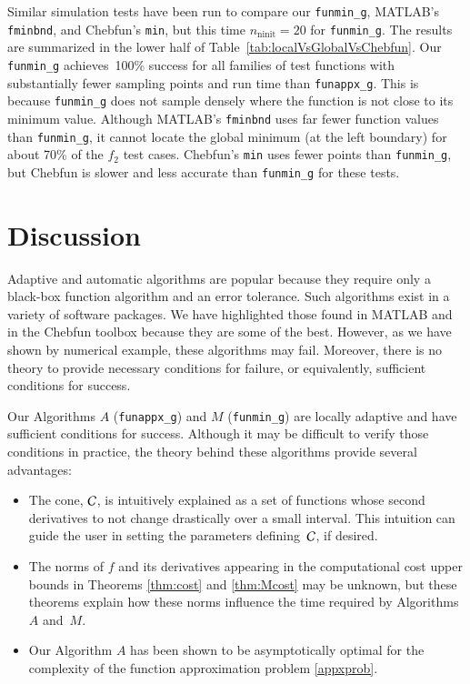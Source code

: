 \documentclass[review]{elsarticle}
\theoremstyle{definition}
\DeclareMathOperator{\ninit}{ninit}
\newcommand{\funappxg}{\texttt{funappx\_g}\xspace}
\newcommand{\funming}{\texttt{funmin\_g}\xspace}
\newcommand{\fminbnd}{\texttt{fminbnd}\xspace}
\begin{document}
Similar simulation tests have been run to compare our \funming, MATLAB's \fminbnd, and
Chebfun's \texttt{min}, but this time $n_{\ninit} = 20$ for \funming. The results are
summarized in the lower half of
Table~\ref{tab:localVsGlobalVsChebfun}. Our \funming{} achieves~100\%
success for all families of test functions with substantially fewer sampling
points and run time than \funappxg. This is because \funming does not 
sample densely where the function is not close to its minimum value. Although MATLAB's
\fminbnd uses far fewer function values than \funming, it cannot locate the
global minimum (at the left boundary) for about 70\% of the $f_2$ test cases.
Chebfun's {\tt min} uses fewer points than \funming, but Chebfun is slower and
less accurate than \funming for these tests.






\section{Discussion}

Adaptive and automatic algorithms are popular because they require only a
black-box function algorithm and an error tolerance. Such algorithms exist in a
variety of software packages. We have highlighted those found in MATLAB and in
the Chebfun toolbox because they are some of the best. However, as we have shown
by numerical example, these algorithms may fail. Moreover,
there is no theory to provide necessary conditions for failure, or equivalently,
sufficient conditions for success.

Our Algorithms $A$ (\funappxg) and $M$ (\funming) are locally adaptive and have
sufficient conditions for success. Although it may be difficult to
verify those conditions in practice, the theory behind these algorithms provide
several advantages:

\begin{itemize}
	
\item The cone, $\mathcal{C}$, is intuitively explained as a set of functions whose  second
derivatives to not change drastically over a small interval.
This intuition can guide the user in setting the parameters defining~$\mathcal{C}$, if
 desired.
	
\item The norms of $f$ and its derivatives appearing in the computational cost
upper bounds in Theorems \ref{thm:cost} and \ref{thm:Mcost} may be unknown, but
these theorems explain how these norms influence the time required by
Algorithms $A$ and~$M$.
	
\item Our Algorithm $A$ has been shown to be asymptotically optimal for the
complexity of the function approximation problem \eqref{appxprob}.
	
\end{itemize}
\end{document}
